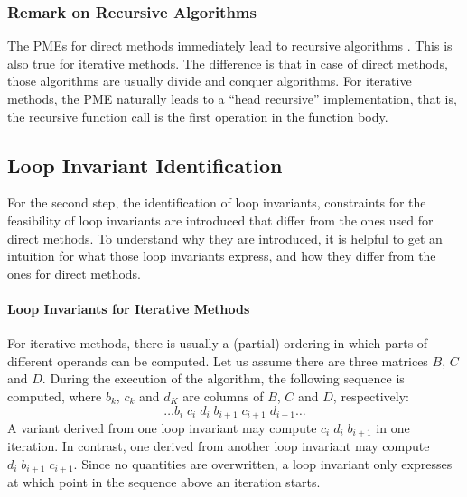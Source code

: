 \subsubsection{Remark on Recursive Algorithms}
The PMEs for direct methods immediately lead to recursive algorithms \cite{Bientinesi:thesis, Fabregat-Traver:thesis}. This is also true for iterative methods. The difference is that in case of direct methods, those algorithms are usually divide and conquer algorithms. For iterative methods, the PME naturally leads to a ``head recursive'' implementation, that is, the recursive function call is the first operation in the function body.

\subsection{Loop Invariant Identification}

For the second step, the identification of loop invariants, constraints for the feasibility of loop invariants are introduced that differ from the ones used for direct methods. To understand why they are introduced, it is helpful to get an intuition for what those loop invariants express, and how they differ from the ones for direct methods.

\paragraph{Loop Invariants for Iterative Methods}

For iterative methods, there is usually a (partial) ordering in which parts of different operands can be computed. Let us assume there are three matrices $B$, $C$ and $D$. During the execution of the algorithm, the following sequence is computed, where $b_k$, $c_k$ and $d_K$ are columns of $B$, $C$ and $D$, respectively:
%
$$\ldots b_i \; c_i \; d_i \; b_{i+1} \; c_{i+1} \; d_{i+1} \ldots$$
%
A variant derived from one loop invariant may compute $c_i \; d_i \; b_{i+1}$ in one iteration. In contrast, one derived from another loop invariant may compute $d_i \; b_{i+1} \; c_{i+1}$.
%
%
Since no quantities are overwritten, a loop invariant only expresses at which point in the sequence above an iteration starts.

